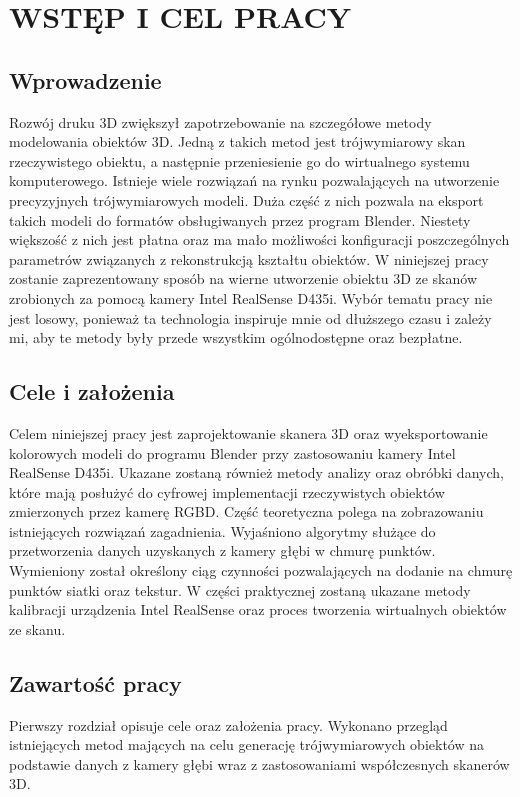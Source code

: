 \documentclass[10pt]{article}
\begin{document}
\section{WSTĘP I CEL PRACY}
\subsection{Wprowadzenie}
Rozwój druku 3D zwiększył zapotrzebowanie na szczegółowe metody modelowania obiektów 3D. Jedną z takich metod jest trójwymiarowy skan rzeczywistego obiektu, a następnie przeniesienie go do wirtualnego systemu komputerowego. Istnieje wiele rozwiązań na rynku pozwalających na utworzenie precyzyjnych trójwymiarowych modeli. Duża część z nich pozwala na eksport takich modeli do formatów obsługiwanych przez program Blender. Niestety większość z nich jest płatna oraz ma mało możliwości konfiguracji poszczególnych parametrów związanych z rekonstrukcją kształtu obiektów. W niniejszej pracy zostanie zaprezentowany sposób na wierne utworzenie obiektu 3D ze skanów zrobionych za pomocą kamery Intel RealSense D435i. Wybór tematu pracy nie jest losowy, ponieważ ta technologia inspiruje mnie od dłuższego czasu i zależy mi, aby te metody były przede wszystkim ogólnodostępne oraz bezpłatne.
\subsection{Cele i założenia}
Celem niniejszej pracy jest zaprojektowanie skanera 3D oraz wyeksportowanie kolorowych modeli do programu Blender przy zastosowaniu kamery Intel RealSense D435i.
Ukazane zostaną również metody analizy oraz obróbki danych, które mają posłużyć do cyfrowej implementacji rzeczywistych obiektów zmierzonych przez kamerę RGBD. Część teoretyczna polega na zobrazowaniu istniejących rozwiązań zagadnienia. Wyjaśniono algorytmy służące do przetworzenia danych uzyskanych z kamery głębi w chmurę punktów. Wymieniony został określony ciąg czynności pozwalających na dodanie na chmurę punktów siatki oraz tekstur. W części praktycznej zostaną ukazane metody kalibracji urządzenia Intel RealSense oraz proces tworzenia wirtualnych obiektów ze skanu.
\subsection{Zawartość pracy}
Pierwszy rozdział opisuje cele oraz założenia pracy. Wykonano przegląd istniejących metod mających na celu generację trójwymiarowych obiektów na podstawie danych z kamery głębi wraz z zastosowaniami współczesnych skanerów 3D.
\end{document}
